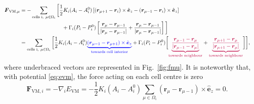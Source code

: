\documentclass[aps, superscriptaddress, notitlepage]{revtex4-1}
\begin{document}
\begin{equation}
\begin{aligned}
\boldsymbol{F}_{\mathrm{VM},\mu} &= - \sum_{\text{cells i},~ \mu \in \Omega_i} \bigg[\frac{1}{2} K_i (A_i - A^0_i) \left[(\boldsymbol{r}_{\mu + 1} - \boldsymbol{r}_i) \times \hat{\boldsymbol{e}}_z - (\boldsymbol{r}_{\mu - 1} - \boldsymbol{r}_i) \times \hat{\boldsymbol{e}}_z\right]\\
&\qquad\qquad\qquad\qquad+ \Gamma_i (P_i - P^0_i) \left[\frac{\boldsymbol{r}_{\mu} - \boldsymbol{r}_{\mu - 1}}{|\boldsymbol{r}_{\mu} - \boldsymbol{r}_{\mu - 1}|} + \frac{\boldsymbol{r}_{\mu} - \boldsymbol{r}_{\mu - 1}}{|\boldsymbol{r}_{\mu} - \boldsymbol{r}_{\mu - 1}|}\right]\bigg]\\
&= \sum_{\text{cells i},~ \mu \in \Omega_i} \bigg[\frac{1}{2} K_i (A_i - A^0_i) {\color{blue} \underbrace{(\boldsymbol{r}_{\mu - 1} - \boldsymbol{r}_{\mu + 1}) \times \hat{\boldsymbol{e}}_z}_{\text{towards cell interior}}} + \Gamma_i (P_i - P^0_i) \bigg[{\color{purple} \underbrace{\frac{\boldsymbol{r}_{\mu - 1} - \boldsymbol{r}_{\mu}}{|\boldsymbol{r}_{\mu - 1} - \boldsymbol{r}_{\mu}|}}_{\text{towards neighbour}}} + {\color{purple} \underbrace{\frac{\boldsymbol{r}_{\mu + 1} - \boldsymbol{r}_{\mu}}{|\boldsymbol{r}_{\mu + 1} - \boldsymbol{r}_{\mu}|}}_{\text{towards neighbour}}}\bigg]\bigg],
\end{aligned}
\end{equation}
where underbraced vectors are represented in Fig.~\ref{fig:fmu}. It is noteworthy that, with potential \eqref{eq:evm}, the force acting on each cell centre is zero
\begin{equation}
\boldsymbol{F}_{\mathrm{VM}, i} = - \nabla_i E_{\mathrm{VM}} = - \frac{1}{2} K_i (A_i - A^0_i) \sum_{\mu \in \Omega_i} (\boldsymbol{r}_{\mu} - \boldsymbol{r}_{\mu - 1}) \times \hat{\boldsymbol{e}}_z = 0.
\end{equation}
\end{document}
